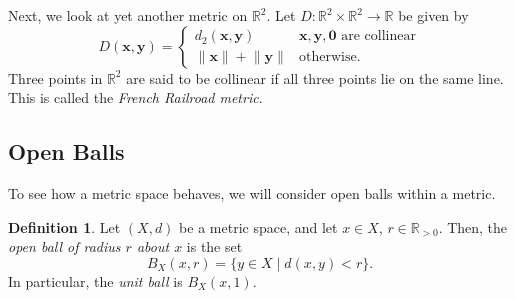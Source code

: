 \documentclass[a4paper, openany]{memoir}
\theoremstyle{definition}
\newtheorem{definition}{Definition}[section]
\theoremstyle{plain}
\begin{document}
Next, we look at yet another metric on $\mathbb{R}^2$. Let $D: \mathbb{R}^2 \times \mathbb{R}^2 \to \mathbb{R}$ be given by
\[D(\bm{x}, \bm{y}) = \begin{cases}
d_2(\bm{x}, \bm{y}) & \bm{x}, \bm{y}, \bm{0} \text{ are collinear} \\
\lVert \bm{x} \rVert + \lVert \bm{y} \rVert & \text{otherwise}.
\end{cases}\]
Three points in $\mathbb{R}^2$ are said to be collinear if all three points lie on the same line. This is called the \emph{French Railroad metric}.

\subsection{Open Balls}
To see how a metric space behaves, we will consider open balls within a metric.
\begin{definition}
Let $(X, d)$ be a metric space, and let $x \in X$, $r \in \mathbb{R}_{> 0}$. Then, the \emph{open ball of radius $r$ about $x$} is the set
\[B_X(x, r) = \{y \in X \mid d(x, y) < r\}.\]
In particular, the \emph{unit ball} is $B_X(x, 1)$.
\end{definition}
\end{document}
